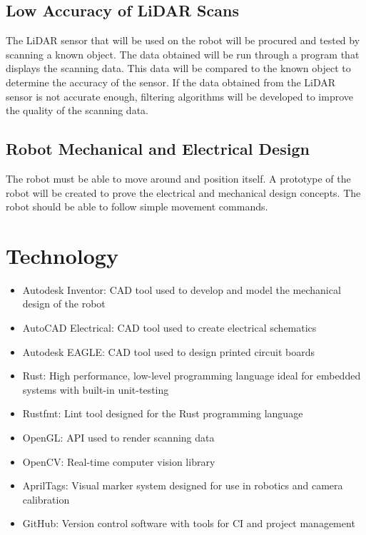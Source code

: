 \documentclass[titlepage]{article}
\begin{document}
\subsection{Low Accuracy of LiDAR Scans}

The LiDAR sensor that will be used on the robot will be procured and tested by scanning a known object. The data obtained will be run through a program that displays the scanning data. This data will be compared to the known object to determine the accuracy of the sensor. If the data obtained from the LiDAR sensor is not accurate enough, filtering algorithms will be developed to improve the quality of the scanning data.

\subsection{Robot Mechanical and Electrical Design}

The robot must be able to move around and position itself. A prototype of the robot will be created to prove the electrical and mechanical design concepts. The robot should be able to follow simple movement commands.

\section{Technology}

\begin{itemize}
\item Autodesk Inventor: CAD tool used to develop and model the mechanical design of the robot
\item AutoCAD Electrical: CAD tool used to create electrical schematics
\item Autodesk EAGLE: CAD tool used to design printed circuit boards
\item Rust: High performance, low-level programming language ideal for embedded systems with built-in unit-testing
\item Rustfmt: Lint tool designed for the Rust programming language
\item OpenGL: API used to render scanning data
\item OpenCV: Real-time computer vision library 
\item AprilTags: Visual marker system designed for use in robotics and camera calibration
\item GitHub: Version control software with tools for CI and project management

\end{itemize}
\end{document}
